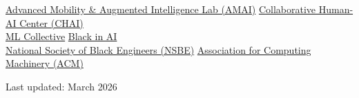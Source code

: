 \documentclass[a4paper,11pt]{article}
\begin{document}
\href{https://www.amai-gsu.us/}{Advanced Mobility \& Augmented Intelligence Lab (AMAI)} \hfill
\href{https://chai.gsu.edu/}{Collaborative Human-AI Center (CHAI)} \\[4pt]
\href{https://mlcollective.org/}{ML Collective} \hfill
\href{https://blackinai.org/}{Black in AI} \\[4pt]
\href{https://nsbe.org/}{National Society of Black Engineers (NSBE)} \hfill
\href{https://acm.cs.gsu.edu/doku.php?id=current_officers}{Association for Computing Machinery (ACM)}

\vfill
\begin{center}
  \footnotesize\color{subtle} Last updated: March 2026
\end{center}
\end{document}
